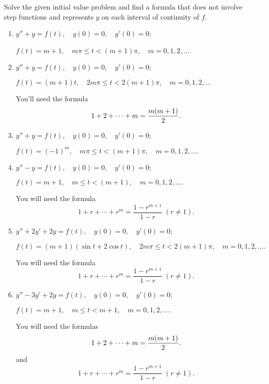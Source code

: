 \documentclass{ximera}
\begin{document}
\begin{problem}\label{exer:8.5.22} Solve the given initial value problem and find a
formula that does not involve step functions and represents $y$ on
each interval of continuity of $f$.
\begin{enumerate}
\item %
$y''+y=f(t), \quad  y(0)=0,\quad  y'(0)=0$;

$f(t)=m+1,\quad  m\pi\le t<(m+1)\pi,\quad m=0,1,2,\dots$.

\item %
$y''+y=f(t), \quad  y(0)=0,\quad y'(0)=0$;

$f(t)=(m+1)t, \quad   2m\pi\le t<2(m+1)\pi,\quad m=0,1,2,\dots$

\begin{hint}
You'll need the formula
$$
1+2+\cdots+m={m(m+1)\over2}.
$$  
\end{hint}

\item %
$y''+y=f(t), \quad  y(0)=0,\quad  y'(0)=0$;

$f(t)=(-1)^m,\quad  m\pi\le t<(m+1)\pi,\quad m=0,1,2,\dots.$

\item %
$y''-y=f(t), \quad  y(0)=0,\quad  y'(0)=0$;

$f(t)=m+1,\quad  m\le t<(m+1),\quad m=0,1,2,\dots.$

\begin{hint}
You will need the formula
$$
1+r+\cdots+r^m=\frac{1-r^{m+1}}{1-r}\; (r\ne1).
$$
\end{hint}

\item %
$y''+2y'+2y=f(t), \quad  y(0)=0,\quad  y'(0)=0$;

$f(t)=(m+1)(\sin t+2\cos t),\quad  2m\pi\le t<2(m+1)\pi,\quad
m=0,1,2,\dots.$

\begin{hint}
You will need the formula
$$
1+r+\cdots+r^m=\frac{1-r^{m+1}}{1-r}\; (r\ne1).
$$
\end{hint}

\item %
$y''-3y'+2y=f(t), \quad  y(0)=0,\quad y'(0)=0$;

$f(t)=m+1,\quad  m\le t<m+1,\quad m=0,1,2,\dots.$

\begin{hint}
You will need the formulas
$$
1+2+\cdots+m={m(m+1)\over2}.
$$ 
and
$$
1+r+\cdots+r^m=\frac{1-r^{m+1}}{1-r}\; (r\ne1).
$$
\end{hint}
\end{enumerate}
\end{problem}
\end{document}
